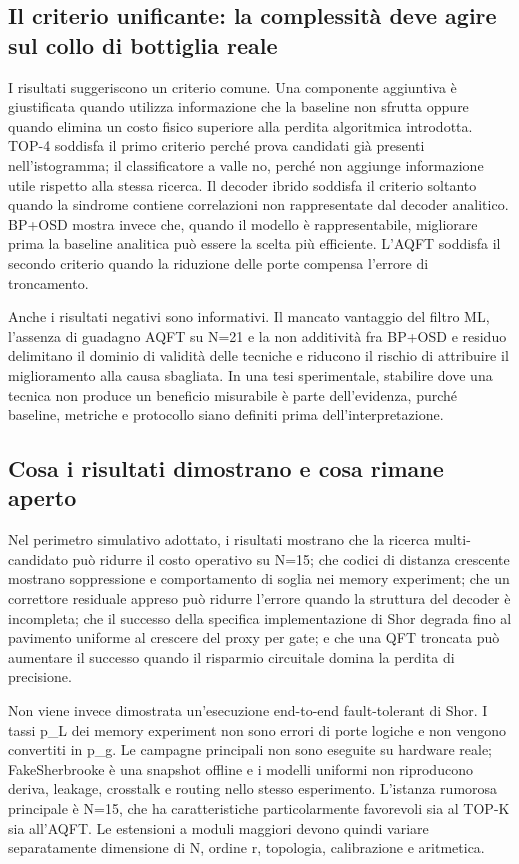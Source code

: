 \subsection{Il criterio unificante: la complessità deve agire sul collo di bottiglia reale}\label{sec:finale_5_6_2}

I risultati suggeriscono un criterio comune. Una componente aggiuntiva è giustificata quando utilizza informazione che la baseline non sfrutta oppure quando elimina un costo fisico superiore alla perdita algoritmica introdotta. TOP-4 soddisfa il primo criterio perché prova candidati già presenti nell'istogramma; il classificatore a valle no, perché non aggiunge informazione utile rispetto alla stessa ricerca. Il decoder ibrido soddisfa il criterio soltanto quando la sindrome contiene correlazioni non rappresentate dal decoder analitico. BP+OSD mostra invece che, quando il modello è rappresentabile, migliorare prima la baseline analitica può essere la scelta più efficiente. L'AQFT soddisfa il secondo criterio quando la riduzione delle porte compensa l'errore di troncamento.

Anche i risultati negativi sono informativi. Il mancato vantaggio del filtro ML, l'assenza di guadagno AQFT su N=21 e la non additività fra BP+OSD e residuo delimitano il dominio di validità delle tecniche e riducono il rischio di attribuire il miglioramento alla causa sbagliata. In una tesi sperimentale, stabilire dove una tecnica non produce un beneficio misurabile è parte dell'evidenza, purché baseline, metriche e protocollo siano definiti prima dell'interpretazione.

\subsection{Cosa i risultati dimostrano e cosa rimane aperto}\label{sec:finale_5_6_3}

Nel perimetro simulativo adottato, i risultati mostrano che la ricerca multi-candidato può ridurre il costo operativo su N=15; che codici di distanza crescente mostrano soppressione e comportamento di soglia nei memory experiment; che un correttore residuale appreso può ridurre l'errore quando la struttura del decoder è incompleta; che il successo della specifica implementazione di Shor degrada fino al pavimento uniforme al crescere del proxy per gate; e che una QFT troncata può aumentare il successo quando il risparmio circuitale domina la perdita di precisione.

Non viene invece dimostrata un'esecuzione end-to-end fault-tolerant di Shor. I tassi p\_L dei memory experiment non sono errori di porte logiche e non vengono convertiti in p\_g. Le campagne principali non sono eseguite su hardware reale; FakeSherbrooke è una snapshot offline e i modelli uniformi non riproducono deriva, leakage, crosstalk e routing nello stesso esperimento. L'istanza rumorosa principale è N=15, che ha caratteristiche particolarmente favorevoli sia al TOP-K sia all'AQFT. Le estensioni a moduli maggiori devono quindi variare separatamente dimensione di N, ordine r, topologia, calibrazione e aritmetica.

